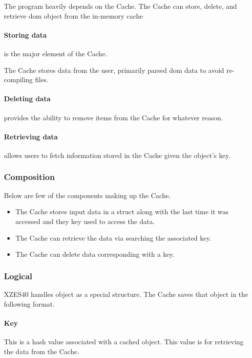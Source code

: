 The program heavily depends on the Cache.
The Cache can store, delete, and retrieve \gls{dom} object from the in-memory cache 

\paragraph{Storing data} is the major element of the Cache.

The Cache stores data from the user, primarily parsed \gls{dom} data to avoid re-compiling files.

\paragraph{Deleting data} provides the ability to remove items from the Cache for whatever reason.

\paragraph{Retrieving data} allows users to fetch information stored in the Cache given the object's key.

\subsubsection{Composition}

Below are few of the components making up the Cache.

\begin{itemize}
    \item The Cache stores input data in a \gls{struct} along with the last time it was accessed and they key used to access the data.
    \item The Cache can retrieve the data via searching the associated key.
    \item The Cache can delete data corresponding with a key.
\end{itemize}

\subsubsection{Logical}

XZES40 handles object as a special structure.
The Cache saves that object in the following format.

\paragraph{Key}
This is a hash value associated with a cached object.
This value is for retrieving the data from the Cache.

